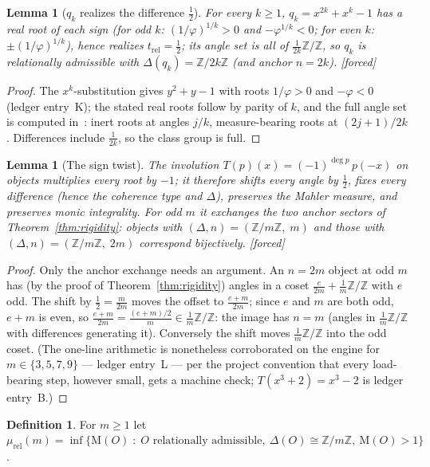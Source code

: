 \documentclass[11pt]{article}
\theoremstyle{plain}
\newtheorem{lemma}[theorem]{Lemma}
\theoremstyle{definition}
\newtheorem{definition}[theorem]{Definition}
\theoremstyle{remark}
\newcommand{\Z}{\mathbb{Z}}
\newcommand{\Mah}{\mathrm{M}}
\newcommand{\F}{\textnormal{[forced]}}
\begin{document}
\begin{lemma}[$q_k$ realizes the difference $\tfrac12$]\label{lem:qk}
For every $k\ge1$, $q_k=x^{2k}+x^k-1$ has a real root of each sign
(for odd $k$: $(1/\varphi)^{1/k}>0$ and $-\varphi^{1/k}<0$; for even $k$:
$\pm(1/\varphi)^{1/k}$), hence realizes
$t_{\mathrm{rel}}=\tfrac12$; its angle set is all of $\frac{1}{2k}\Z/\Z$, so
$q_k$ is relationally admissible with $\Delta(q_k)=\Z/2k\Z$ (and anchor $n=2k$).
\F
\end{lemma}

\begin{proof}
The $x^k$-substitution gives $y^2+y-1$ with roots $1/\varphi>0$ and $-\varphi<0$
(ledger entry~K); the stated real roots follow by parity of $k$, and the full
angle set is computed in~\cite[Thm.~5.1]{CMC}: inert roots at angles $j/k$,
measure-bearing roots at $(2j+1)/2k$. Differences include $\frac{1}{2k}$, so the
class group is full.
\end{proof}

\begin{lemma}[The sign twist]\label{lem:twist}
The involution $T(p)(x)=(-1)^{\deg p}\,p(-x)$ on objects multiplies every root by
$-1$; it therefore shifts every angle by $\tfrac12$, fixes every difference
(hence the coherence type and $\Delta$), preserves the Mahler measure, and
preserves monic integrality. For odd $m$ it exchanges the two anchor sectors of
Theorem~\ref{thm:rigidity}: objects with $(\Delta,n)=(\Z/m\Z,\;m)$ and those with
$(\Delta,n)=(\Z/m\Z,\;2m)$ correspond bijectively. \F
\end{lemma}

\begin{proof}
Only the anchor exchange needs an argument. An $n=2m$ object at odd $m$ has (by
the proof of Theorem~\ref{thm:rigidity}) angles in a coset
$\frac{e}{2m}+\frac1m\Z/\Z$ with $e$ odd. The shift by
$\tfrac12=\frac{m}{2m}$ moves the offset to $\frac{e+m}{2m}$; since $e$ and
$m$ are both odd, $e+m$ is even, so
$\frac{e+m}{2m}=\frac{(e+m)/2}{m}\in\frac1m\Z/\Z$: the image has $n=m$
(angles in $\frac1m\Z/\Z$ with differences generating it). Conversely the
shift moves $\frac1m\Z/\Z$ into the odd coset. (The one-line arithmetic is
nonetheless corroborated on the engine for $m\in\{3,5,7,9\}$ --- ledger
entry~L --- per the project convention that every load-bearing step, however
small, gets a machine check; $T(x^3+2)=x^3-2$ is ledger entry~B.)
\end{proof}

\begin{definition}
For $m\ge1$ let
$\mu_{\mathrm{rel}}(m)=\inf\bigl\{\Mah(O)\;:\;O\text{ relationally
admissible},\ \Delta(O)\cong\Z/m\Z,\ \Mah(O)>1\bigr\}$.
\end{definition}
\end{document}
